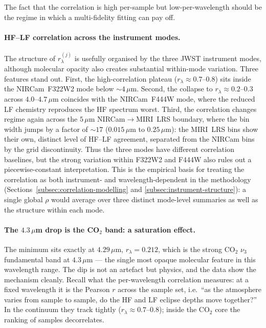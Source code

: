\documentclass[11pt,a4paper]{article}
\newcommand{\perwlmin}{0.212}      %
\newcommand{\perwlminlam}{4.29}    %
\begin{document}
The fact that the correlation is high per-sample but low-per-wavelength should be the regime in which a multi-fidelity fitting can pay off.

\paragraph{HF--LF correlation across the instrument modes.}
The structure of $r_{\lambda}^{(j)}$ is usefully organised by the three JWST
instrument modes, although molecular opacity also creates substantial
within-mode variation. Three features stand out.
First, the high-correlation plateau ($r_{\lambda}\!\approx\!0.7$--$0.8$) sits
inside the NIRCam~F322W2 mode below $\sim\!4\,\mu$m. Second, the collapse to
$r_{\lambda}\!\approx\!0.2$--$0.3$ across $4.0$--$4.7\,\mu$m coincides with the
NIRCam~F444W mode, where the reduced LF chemistry reproduces the HF spectrum
worst. Third, the correlation changes regime again across the $5\,\mu$m
NIRCam$\to$MIRI~LRS boundary, where the bin width jumps by a factor of
$\sim\!17$ ($0.015\,\mu$m to $0.25\,\mu$m): the MIRI~LRS bins show their own,
distinct level of HF--LF agreement, separated from the NIRCam bins by the grid
discontinuity. Thus the three modes have different correlation baselines, but
the strong variation within F322W2 and F444W also rules out a
piecewise-constant interpretation. This is the empirical basis for treating
the correlation as both instrument- and wavelength-dependent in the methodology
(Sections~\ref{subsec:correlation-modelling} and
\ref{subsec:instrument-structure}): a single global $\rho$ would average over
three distinct mode-level summaries as well as the structure within each mode.

\paragraph{The $4.3\,\mu$m drop is the CO$_2$ band: a saturation effect.}
The minimum sits exactly at $\perwlminlam\,\mu$m, $r_{\lambda}=\perwlmin{}$,
which is the strong CO$_2$ $\nu_3$ fundamental band at $4.3\,\mu$m --- the single
most opaque molecular feature in this wavelength range. The dip is not an
artefact but physics, and the data show the mechanism cleanly. Recall what the
per-wavelength correlation measures: at a fixed wavelength it is the Pearson $r$
across the sample set, i.e.\ ``as the atmosphere varies from sample to sample, do
the HF and LF eclipse depths move together?'' In the continuum they track tightly
($r_{\lambda}\!\approx\!0.7$--$0.8$); inside the CO$_2$ core the ranking of
samples decorrelates.
\end{document}
